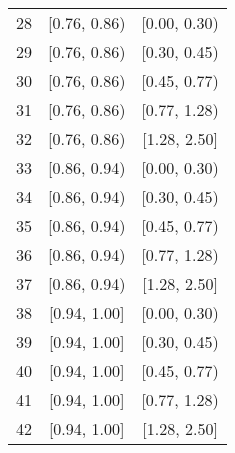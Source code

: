 \begin{table}[]
\begin{tabular}{ccc}
28 & [0.76,  0.86) & [0.00,  0.30) \\
29 & [0.76,  0.86) & [0.30,  0.45)\\
30 & [0.76,  0.86) & [0.45,  0.77)\\
31 & [0.76,  0.86) & [0.77,  1.28)\\
32 & [0.76,  0.86) & [1.28,  2.50] \\
33 & [0.86,  0.94) & [0.00,  0.30)\\
34 & [0.86,  0.94) & [0.30,  0.45)\\
35 & [0.86,  0.94) & [0.45,  0.77)\\
36 & [0.86,  0.94) & [0.77,  1.28)\\
37 & [0.86,  0.94) & [1.28,  2.50] \\
38 & [0.94,  1.00] & [0.00,  0.30)\\
39 & [0.94,  1.00] & [0.30,  0.45)\\
40 & [0.94,  1.00] & [0.45,  0.77)\\
41 & [0.94,  1.00] & [0.77,  1.28)\\
42 & [0.94,  1.00] & [1.28,  2.50] \\
\bottomrule
\end{tabular}
\end{table}





